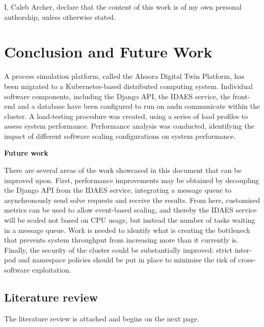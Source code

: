 \documentclass[12pt,a4paper]{uwthesis17}
\begin{document}
\begin{authorship-declaration}

\noindent I, Caleb Archer, declare that the content of this work is of my own personal authorship, unless otherwise stated.

\end{authorship-declaration}

\tableofcontents

\listoffigures

\listoftables

\newpage

\setcounter{page}{1}







\chapter{Conclusion and Future Work}

A process simulation platform, called the Ahuora Digital Twin Platform, has been migrated to a Kubernetes-based distributed computing system. Individual software components, including the Django API, the IDAES service, the front-end and a database have been configured to run on andn communicate within the cluster. A load-testing procedure was created, using a series of load profiles to assess system performance. Performance analysis was conducted, identifying the impact of different software scaling configurations on system performance.

\vspace{1cm}

\noindent\textbf{Future work}

\noindent There are several areas of the work showcased in this document that can be improved upon. First, performance improvements may be obtained by decoupling the Django API from the IDAES service, integrating a message queue to asynchronously send solve requests and receive the results. From here, customised metrics can be used to allow event-based scaling, and thereby the IDAES service will be scaled not based on CPU usage, but instead the number of tasks waiting in a message queue. Work is needed to identify what is creating the bottleneck that prevents system throughput from increasing more than it currently is. Finally, the security of the cluster could be substantially improved: strict inter-pod and namespace policies should be put in place to minimise the risk of cross-software exploitation.

\printbibliography

\begin{appendices}
\chapter{Literature review}

The literature review is attached and begins on the next page.
\clearpage


\end{appendices}
\end{document}
